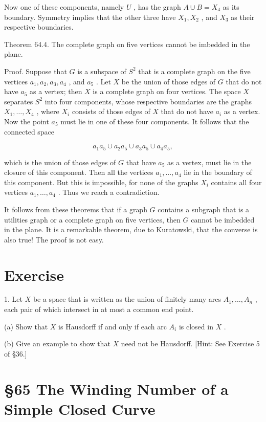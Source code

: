 Now one of these components, namely \(U\) , has the graph \(A \cup  B = {X}_{4}\) as its boundary. Symmetry implies that the other three have \({X}_{1},{X}_{2}\) , and \({X}_{3}\) as their respective boundaries.

Theorem 64.4. The complete graph on five vertices cannot be imbedded in the plane.

Proof. Suppose that \(G\) is a subspace of \({S}^{2}\) that is a complete graph on the five vertices \({a}_{1},{a}_{2},{a}_{3},{a}_{4}\) , and \({a}_{5}\) . Let \(X\) be the union of those edges of \(G\) that do not have \({a}_{5}\) as a vertex; then \(X\) is a complete graph on four vertices. The space \(X\) separates \({S}^{2}\) into four components, whose respective boundaries are the graphs \({X}_{1},\ldots ,{X}_{4}\) , where \({X}_{i}\) consists of those edges of \(X\) that do not have \({a}_{i}\) as a vertex. Now the point \({a}_{5}\) must lie in one of these four components. It follows that the connected space

\[
{a}_{1}{a}_{5} \cup  {a}_{2}{a}_{5} \cup  {a}_{3}{a}_{5} \cup  {a}_{4}{a}_{5},
\]

which is the union of those edges of \(G\) that have \({a}_{5}\) as a vertex, must lie in the closure of this component. Then all the vertices \({a}_{1},\ldots ,{a}_{4}\) lie in the boundary of this component. But this is impossible, for none of the graphs \({X}_{i}\) contains all four vertices \({a}_{1},\ldots ,{a}_{4}\) . Thus we reach a contradiction.

It follows from these theorems that if a graph \(G\) contains a subgraph that is a utilities graph or a complete graph on five vertices, then \(G\) cannot be imbedded in the plane. It is a remarkable theorem, due to Kuratowski, that the converse is also true! The proof is not easy.

\section*{Exercise}

1. Let \(X\) be a space that is written as the union of finitely many arcs \({A}_{1},\ldots ,{A}_{n}\) , each pair of which intersect in at most a common end point.

(a) Show that \(X\) is Hausdorff if and only if each arc \({A}_{i}\) is closed in \(X\) .

(b) Give an example to show that \(X\) need not be Hausdorff. [Hint: See Exercise 5 of  \S 36.]

\section*{ \S 65 The Winding Number of a Simple Closed Curve}

